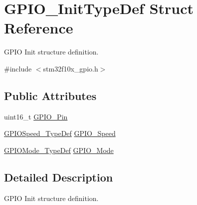 \hypertarget{structGPIO__InitTypeDef}{
\section{GPIO\_\-InitTypeDef Struct Reference}
\label{structGPIO__InitTypeDef}
}


GPIO Init structure definition.  




{\ttfamily \#include $<$stm32f10x\_\-gpio.h$>$}

\subsection*{Public Attributes}
\begin{DoxyCompactItemize}
\item 
uint16\_\-t \hyperlink{structGPIO__InitTypeDef_a35fc26fc58226126c5b99478a472e5e9}{GPIO\_\-Pin}
\item 
\hyperlink{group__GPIO__Exported__Types_ga062ad92b67b4a1f301c161022cf3ba8e}{GPIOSpeed\_\-TypeDef} \hyperlink{structGPIO__InitTypeDef_ac05832cacebc861a9acf5294d702c16b}{GPIO\_\-Speed}
\item 
\hyperlink{group__GPIO__Exported__Types_ga1347339e1c84a196fabbb31205eec5d4}{GPIOMode\_\-TypeDef} \hyperlink{structGPIO__InitTypeDef_a55bd77e335c2bfeec9caa5dc922b791b}{GPIO\_\-Mode}
\end{DoxyCompactItemize}


\subsection{Detailed Description}
GPIO Init structure definition. 

